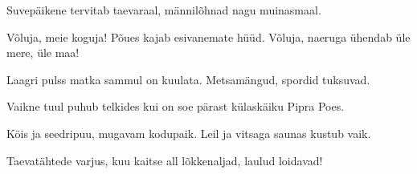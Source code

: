 Suvep\"aikene tervitab taevaraal,
m\"annil\~ohnad nagu muinasmaal.

V\~oluja, meie koguja!
P\~oues kajab esivanemate h\"u\"ud.
V\~oluja, naeruga \"uhendab
\"ule mere, \"ule maa!

Laagri pulss matka sammul on kuulata.
Metsam\"angud, spordid tuksuvad.

Vaikne tuul puhub telkides kui on soe
p\"arast k\"ulask\"aiku Pipra Poes.

K\"ois ja seedripuu, mugavam kodupaik.
Leil ja vitsaga saunas kustub vaik.

Taevat\"ahtede varjus, kuu kaitse all
l\~okkenaljad, laulud loidavad!